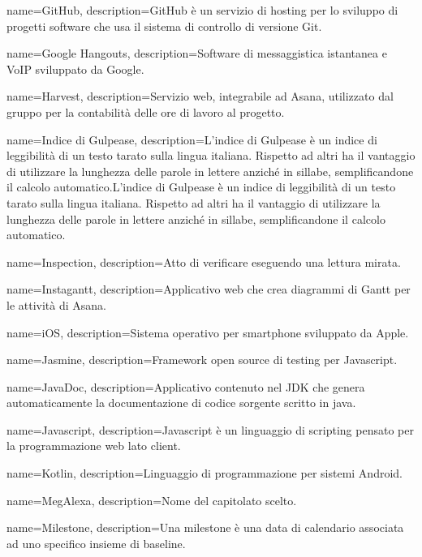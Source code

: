 {
name={GitHub},
description={GitHub è un servizio di hosting per lo sviluppo di progetti software che usa il sistema di controllo di versione Git.}
}

{
name={Google Hangouts},
description={Software di messaggistica istantanea e VoIP sviluppato da Google.}
}

{
	name={Harvest},
	description={Servizio web, integrabile ad Asana, utilizzato dal gruppo per la contabilità delle ore di lavoro al progetto.}
}

{
name={Indice di Gulpease},
description={L’indice di Gulpease è un indice di leggibilità di un testo tarato sulla lingua italiana. Rispetto ad altri ha il vantaggio di utilizzare la lunghezza delle
parole in lettere anziché in sillabe, semplificandone il calcolo automatico.L’indice di Gulpease è un indice di leggibilità di un testo tarato sulla lingua
italiana. Rispetto ad altri ha il vantaggio di utilizzare la lunghezza delle parole in lettere anziché in sillabe, semplificandone il calcolo automatico.}
}

{
name={Inspection},
description={Atto di verificare eseguendo una lettura mirata.}
}

{
name={Instagantt},
description={Applicativo web che crea diagrammi di Gantt per le attività di Asana.}
}

{
name={iOS},
description={Sistema operativo per smartphone sviluppato da Apple.}
}

{
	name={Jasmine},
	description={Framework open source di testing per Javascript.}
}

{
	name={JavaDoc},
	description={Applicativo contenuto nel JDK che genera automaticamente la documentazione di codice sorgente scritto in java.}
}

{
name={Javascript},
description={Javascript è un linguaggio di scripting pensato per la programmazione web lato client.}
}

{
name={Kotlin},
description={Linguaggio di programmazione per sistemi Android.}
}

{
name={MegAlexa},
description={Nome del capitolato scelto.}
}

{
name={Milestone},
description={Una milestone è una data di calendario associata ad uno specifico insieme di baseline.}
}

